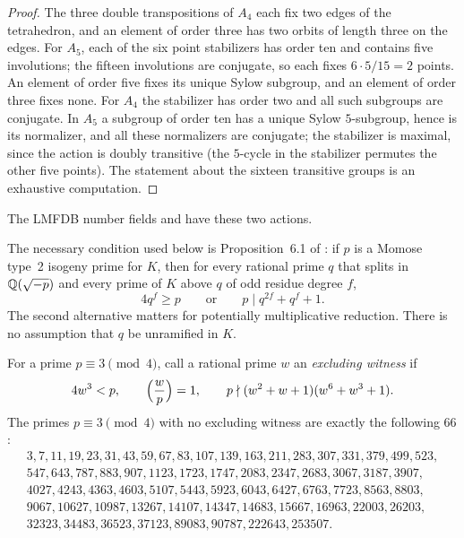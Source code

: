 \begin{proof}
The three double transpositions of $A_4$ each fix two edges of the tetrahedron, and an
element of order three has two orbits of length three on the edges. For $A_5$, each of
the six point stabilizers has order ten and contains five involutions; the fifteen
involutions are conjugate, so each fixes $6\cdot5/15=2$ points. An element of order
five fixes its unique Sylow subgroup, and an element of order three fixes none. For
$A_4$ the stabilizer has order two and all such subgroups are conjugate. In $A_5$ a
subgroup of order ten has a unique Sylow $5$-subgroup, hence is its normalizer, and all
these normalizers are conjugate; the stabilizer is maximal, since the action is doubly
transitive (the $5$-cycle in the stabilizer permutes the other five points). The
statement about the sixteen transitive groups is an exhaustive computation.
\end{proof}

The LMFDB number fields  and  have these two
actions.

The necessary condition used below is Proposition~6.1 of
\cite{BanwaitDerickx2025Explicit}: if $p$ is a Momose type~2 isogeny prime for $K$,
then for every rational prime $q$ that splits in $\mathbb{Q}(\sqrt{-p})$ and every prime of $K$
above $q$ of odd residue degree $f$,
\begin{equation}\label{dir:eq:cc}
 4q^f\ge p\qquad\text{or}\qquad p\mid q^{2f}+q^f+1 .
\end{equation}
The second alternative matters for potentially multiplicative reduction. There is no
assumption that $q$ be unramified in $K$.

\begin{theorem}\label{dir:thm:strictcc}
For a prime $p\equiv3\pmod4$, call a rational prime $w$ an \emph{excluding witness} if
\[
 4w^3<p,\qquad\Bigl(\frac{w}{p}\Bigr)=1,\qquad p\nmid(w^2+w+1)(w^6+w^3+1).
\]
The primes $p\equiv3\pmod4$ with no excluding witness are exactly the following $66$:
\[
\begin{gathered}
3,7,11,19,23,31,43,59,67,83,107,139,163,211,283,307,331,379,499,523,\\
547,643,787,883,907,1123,1723,1747,2083,2347,2683,3067,3187,3907,\\
4027,4243,4363,4603,5107,5443,5923,6043,6427,6763,7723,8563,8803,\\
9067,10627,10987,13267,14107,14347,14683,15667,16963,22003,26203,\\
32323,34483,36523,37123,89083,90787,222643,253507 .
\end{gathered}
\]
\end{theorem}

